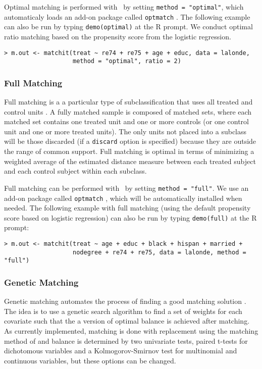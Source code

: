 Optimal matching is performed with \MatchIt\ by setting \texttt{method
  = "optimal"}, which automaticaly loads an add-on package called
\texttt{optmatch} \citep{Hansen04}.  The following example can also be
run by typing {\tt demo(optimal)} at the R prompt.  We conduct optimal
ratio matching based on the propensity score from the logistic
regression.
\begin{verbatim}
> m.out <- matchit(treat ~ re74 + re75 + age + educ, data = lalonde, 
                   method = "optimal", ratio = 2)
\end{verbatim}

\subsubsection{Full Matching}
\label{subsubsec:full}

Full matching is a a particular type of subclassification that uses
all treated and control units \citep{Rosenbaum02, Hansen04}.  A fully
matched sample is composed of matched sets, where each matched set
contains one treated unit and one or more controls (or one control
unit and one or more treated units).  The only units not placed into a
subclass will be those discarded (if a \texttt{discard} option is
specified) because they are outside the range of common support.  Full
matching is optimal in terms of minimizing a weighted average of the
estimated distance measure between each treated subject and each
control subject within each subclass.

Full matching can be performed with \MatchIt\ by setting
\texttt{method = "full"}.  We use an add-on package called
\texttt{optmatch} \citep{Hansen04}, which will be automatically
installed when needed.  The following example with full matching
(using the default propensity score based on logistic regression) can
also be run by typing {\tt demo(full)} at the R prompt:
\begin{verbatim}
> m.out <- matchit(treat ~ age + educ + black + hispan + married +
                   nodegree + re74 + re75, data = lalonde, method = "full")
\end{verbatim}

\subsubsection{Genetic Matching}
\label{subsub:genetic}

Genetic matching automates the process of finding a good matching
solution \citep{DiaSek05}.  The idea is to use a genetic search
algorithm to find a set of weights for each covariate such that the a
version of optimal balance is achieved after matching.  As currently
implemented, matching is done with replacement using the matching
method of \citet{AbaImb04} and balance is determined by two univariate
tests, paired t-tests for dichotomous variables and a
Kolmogorov-Smirnov test for multinomial and continuous variables, but
these options can be changed.

